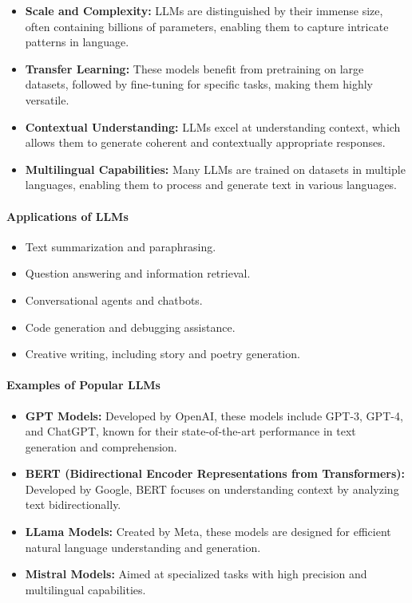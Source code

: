 \begin{itemize}
\item \textbf{Scale and Complexity:} LLMs are distinguished by their immense size, often containing billions of parameters, enabling them to capture intricate patterns in language.
\item \textbf{Transfer Learning:} These models benefit from pretraining on large datasets, followed by fine-tuning for specific tasks, making them highly versatile.
\item \textbf{Contextual Understanding:} LLMs excel at understanding context, which allows them to generate coherent and contextually appropriate responses.
\item \textbf{Multilingual Capabilities:} Many LLMs are trained on datasets in multiple languages, enabling them to process and generate text in various languages.
\end{itemize}

\paragraph{Applications of LLMs}

\begin{itemize}
\item Text summarization and paraphrasing.
\item Question answering and information retrieval.
\item Conversational agents and chatbots.
\item Code generation and debugging assistance.
\item Creative writing, including story and poetry generation.
\end{itemize}

\paragraph{Examples of Popular LLMs}

\begin{itemize}
\item \textbf{GPT Models:} Developed by OpenAI, these models include GPT-3, GPT-4, and ChatGPT, known for their state-of-the-art performance in text generation and comprehension.
\item \textbf{BERT (Bidirectional Encoder Representations from Transformers):} Developed by Google, BERT focuses on understanding context by analyzing text bidirectionally.
\item \textbf{LLama Models:} Created by Meta, these models are designed for efficient natural language understanding and generation.
\item \textbf{Mistral Models:} Aimed at specialized tasks with high precision and multilingual capabilities.
\end{itemize}

